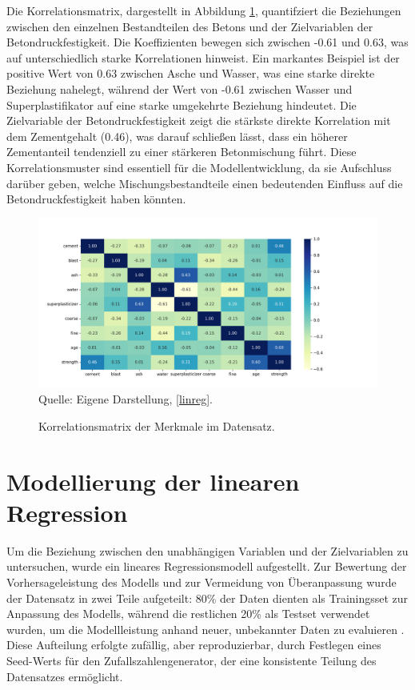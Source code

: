 Die Korrelationsmatrix, dargestellt in Abbildung \ref{pic:corr}, 
quantifziert die Beziehungen zwischen den einzelnen Bestandteilen des Betons und der Zielvariablen der 
Betondruckfestigkeit. Die Koeffizienten bewegen sich zwischen -0.61 und 0.63, was auf 
unterschiedlich starke Korrelationen hinweist. Ein markantes Beispiel ist der positive Wert 
von 0.63 zwischen Asche und Wasser, was eine starke direkte Beziehung nahelegt, während der Wert 
von -0.61 zwischen Wasser und Superplastifikator auf eine starke umgekehrte Beziehung hindeutet. 
Die Zielvariable der Betondruckfestigkeit zeigt die stärkste direkte Korrelation mit dem Zementgehalt (0.46), 
was darauf schließen lässt, dass ein höherer Zementanteil tendenziell zu einer stärkeren Betonmischung führt. 
Diese Korrelationsmuster sind essentiell für die Modellentwicklung, da sie Aufschluss darüber geben, welche 
Mischungsbestandteile einen bedeutenden Einfluss auf die Betondruckfestigkeit haben könnten.

\begin{figure}[h]
    \caption{Korrelationsmatrix der Merkmale im Datensatz.}
    \includegraphics[width=1\textwidth]{../scripts/images/corr.png}
    Quelle: Eigene Darstellung, \ref{linreg}.
    \label{pic:corr}
\end{figure}

\section{Modellierung der linearen Regression}

Um die Beziehung zwischen den unabhängigen Variablen und der Zielvariablen  zu untersuchen, 
wurde ein lineares Regressionsmodell aufgestellt. 
Zur Bewertung der Vorhersageleistung des Modells und zur Vermeidung von Überanpassung wurde der 
Datensatz in zwei Teile aufgeteilt: 80\% der Daten dienten als Trainingsset zur 
Anpassung des Modells, während die restlichen 20\% als Testset verwendet wurden, 
um die Modellleistung anhand neuer, unbekannter Daten zu evaluieren \cite[S. 51]{Molnar_2023}. 
Diese Aufteilung erfolgte zufällig, aber reproduzierbar, durch Festlegen eines Seed-Werts 
für den Zufallszahlengenerator, der eine konsistente Teilung des Datensatzes ermöglicht.

